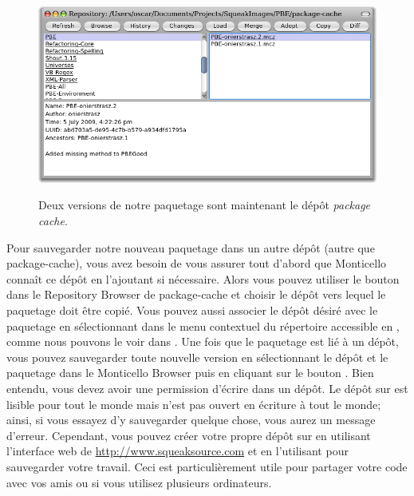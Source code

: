 \documentclass[a4paper,10pt,twoside]{book}
\begin{document}
\begin{figure}[tbp]
	\begin{center}
		{\includegraphics[width=\textwidth]{package-cache-browser}}
	\end{center}
	\caption{Deux versions de notre paquetage sont maintenant le dépôt \emph{package cache}.}
\end{figure}

Pour sauvegarder notre nouveau paquetage dans un autre
dépôt (autre que package-cache), vous avez besoin de vous 
assurer tout d'abord que Monticello connaît
ce dépôt en l'ajoutant si nécessaire.
Alors vous pouvez utiliser le bouton  dans le 
Repository Browser de package-cache et choisir le dépôt vers lequel
le paquetage doit être copié.
Vous pouvez aussi associer le dépôt désiré avec le paquetage
en sélectionnant  
dans le menu contextuel du répertoire accessible en \actclickant,
comme nous pouvons le voir dans .
Une fois que le paquetage est lié à un dépôt, vous pouvez sauvegarder
toute nouvelle version en sélectionnant le dépôt et le paquetage
dans le Monticello Browser puis en cliquant sur le bouton 
 .  
Bien entendu, vous devez avoir une permission d'écrire dans un dépôt.
Le dépôt  sur \emphind{\sqsrc} est
lisible pour tout le monde mais n'est pas ouvert en écriture à tout le monde; 
ainsi, si vous essayez d'y sauvegarder quelque chose, vous aurez un message d'erreur.
Cependant, vous pouvez créer votre propre dépôt sur 
\sqsrc en utilisant l'interface web de \url{http://www.squeaksource.com} et 
en l'utilisant pour sauvegarder votre travail.
Ceci est particulièrement utile pour partager votre code avec vos amis ou
si vous utilisez plusieurs ordinateurs.
\end{document}
